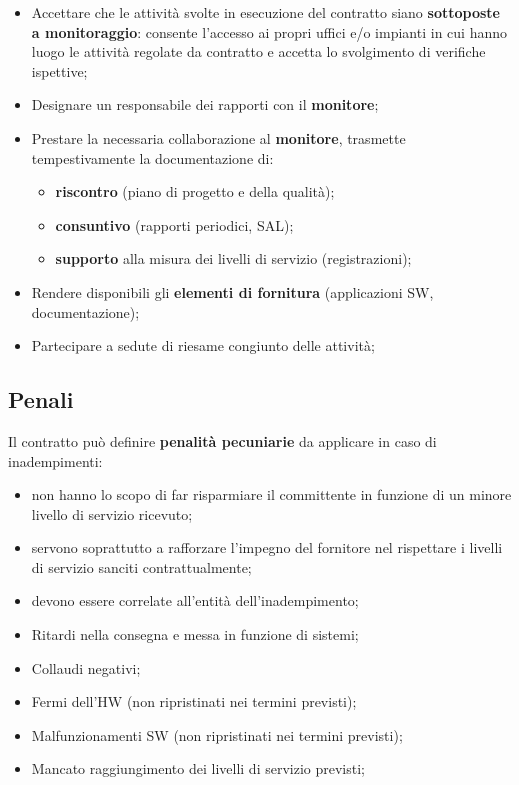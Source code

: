 \documentclass{article}
\begin{document}
\begin{warning}
    \begin{itemize}
        \item Accettare che le attività svolte in esecuzione del contratto siano \textbf{sottoposte a monitoraggio}: consente l'accesso ai propri uffici e/o impianti in cui hanno luogo le attività regolate da contratto e accetta lo svolgimento di verifiche ispettive;
        \item Designare un responsabile dei rapporti con il \textbf{monitore};
        \item Prestare la necessaria collaborazione al \textbf{monitore}, trasmette tempestivamente la documentazione di:
            \begin{itemize}
                \item \textbf{riscontro} (piano di progetto e della qualità);
                \item \textbf{consuntivo} (rapporti periodici, SAL);
                \item \textbf{supporto} alla misura dei livelli di servizio (registrazioni);
            \end{itemize}
        \item Rendere disponibili gli \textbf{elementi di fornitura} (applicazioni SW, documentazione);
        \item Partecipare a sedute di riesame congiunto delle attività;
    \end{itemize}
\end{warning}
%
\subsection{Penali}\label{sub:penali} %
Il contratto può definire \textbf{penalità pecuniarie} da applicare in caso di inadempimenti:
\begin{itemize}
    \item non hanno lo scopo di far risparmiare il committente in funzione di un minore livello di servizio ricevuto;
    \item servono soprattutto a rafforzare l'impegno del fornitore nel rispettare i livelli di servizio sanciti contrattualmente;
    \item devono essere correlate all'entità dell'inadempimento;
\end{itemize}
\begin{example}{}{}
    \begin{itemize}
        \item Ritardi nella consegna e messa in funzione di sistemi;
        \item Collaudi negativi;
        \item Fermi dell'HW (non ripristinati nei termini previsti);
        \item Malfunzionamenti SW (non ripristinati nei termini previsti);
        \item Mancato raggiungimento dei livelli di servizio previsti;
    \end{itemize}
\end{example}
%
\end{document}
